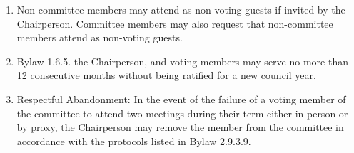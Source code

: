 \begin{enumerate} [label*=\arabic*., align=left]
\begin{enumerate} [label*=\arabic*., align=left]
\begin{enumerate}[label*=\arabic*., align=left]
\begin{enumerate}[label*=\arabic*., align=left]
\end{enumerate}
\item Non-committee members may attend as non-voting guests if invited by the Chairperson. Committee members may also request that non-committee members attend as non-voting guests.
\item Bylaw 1.6.5. the Chairperson, and voting members may serve no more than 12 consecutive months without being ratified for a new council year.
\item Respectful Abandonment: In the event of the failure of a voting member of the committee to attend two meetings during their term either in person or by proxy, the Chairperson may remove the member from the committee in accordance with the protocols listed in Bylaw 2.9.3.9.
\end{enumerate}
\end{enumerate}
\end{enumerate}

